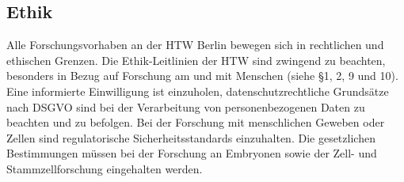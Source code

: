 \subsection{Ethik}
\label{sec:ethik}

Alle Forschungsvorhaben an der HTW Berlin bewegen sich in rechtlichen und ethischen Grenzen. Die Ethik-Leitlinien der HTW \cite{ethikleitfaden_htw} sind zwingend zu beachten, besonders in Bezug auf Forschung am und mit Menschen (siehe §1, 2, 9 und 10). Eine informierte Einwilligung ist einzuholen, datenschutzrechtliche Grundsätze nach DSGVO sind bei der Verarbeitung von personenbezogenen Daten zu beachten und zu befolgen. Bei der Forschung mit menschlichen Geweben oder Zellen sind regulatorische Sicherheitsstandards einzuhalten. Die gesetzlichen Bestimmungen müssen bei der Forschung an Embryonen sowie der Zell- und Stammzellforschung eingehalten werden. 

